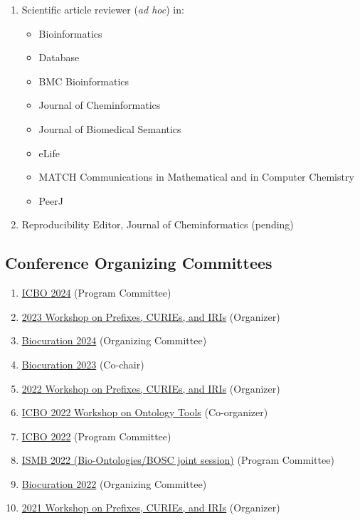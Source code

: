 \documentclass[10pt,a4paper,sans]{moderncv} %
\begin{document}
\begin{enumerate}
\item Scientific article reviewer (\textit{ad hoc}) in:
\begin{itemize}
    \item Bioinformatics
    \item Database
    \item BMC Bioinformatics
    \item Journal of Cheminformatics
    \item Journal of Biomedical Semantics
    \item eLife
    \item MATCH Communications in Mathematical and in Computer Chemistry
    \item PeerJ
\end{itemize}
\item Reproducibility Editor, Journal of Cheminformatics (pending)
\end{enumerate}

    \subsection{Conference Organizing Committees}
    \begin{enumerate}
        \item \href{https://icbo-conference.github.io/icbo2024/}{ICBO 2024} (Program Committee)
        \item \href{https://biopragmatics.github.io/workshops/WPCI2023.html}{2023 Workshop on Prefixes, CURIEs, and IRIs} (Organizer)
        \item \href{https://bioregistry.io/wikidata:Q122167907?provider=scholia}{Biocuration 2024} (Organizing Committee)
        \item \href{https://bioregistry.io/wikidata:Q111430238?provider=scholia}{Biocuration 2023} (Co-chair)
        \item \href{https://biopragmatics.github.io/workshops/WPCI2022.html}{2022 Workshop on Prefixes, CURIEs, and IRIs} (Organizer)
        \item \href{https://icbo-conference.github.io/icbo2022/workshops-and-tutorials/#workshop-on-ontology-tools-and-workflows}{ICBO 2022 Workshop on Ontology Tools} (Co-organizer)
        \item \href{https://icbo-conference.github.io/icbo2022/program-committee}{ICBO 2022} (Program Committee)
        \item \href{https://www.iscb.org/ismb2022-program/abstracts/bio-ontologies}{ISMB 2022 (Bio-Ontologies/BOSC joint session)} (Program Committee)
        \item \href{https://bioregistry.io/wikidata:Q109407979?provider=scholia}{Biocuration 2022} (Organizing Committee)
        \item \href{https://biopragmatics.github.io/workshops/WPCI2021.html}{2021 Workshop on Prefixes, CURIEs, and IRIs} (Organizer)
    \end{enumerate}
\end{document}
